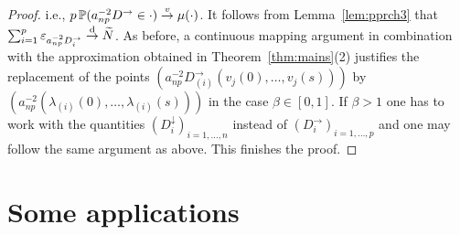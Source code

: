\begin{proof}
i.e., $
 p \, \P(a_{np}^{-2} D^\rightarrow\in \cdot ) \stackrel{v}{\rightarrow} \mu(\cdot)$.
It follows from Lemma~\ref{lem:pprch3} that
$\sum_{i=1}^p\vep_{a_{np}^{-2} D_i^\rightarrow}\std \widetilde{N}$. As before,
a continuous mapping argument in combination with
the approximation obtained in Theorem~\ref{thm:mains}(2)
justifies the replacement of the points $(a_{np}^{-2} D_{(i)}^\rightarrow(v_j(0),\ldots,v_j(s)))$ by
$(a_{np}^{-2} (\lambda_{(i)}(0),\ldots,\lambda_{(i)}(s)))$ in the case $\beta\in [0,1]$. If $\beta>1$ one has to work with the
quantities $(D_i^\downarrow)_{i=1,\ldots,n}$ instead of  $(D_i^\rightarrow)_{i=1,\ldots,p}$ and one may follow the same argument as above.
This finishes the proof.
\end{proof}

\section{Some applications}

